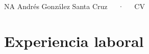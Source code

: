 \documentclass[11pt,a4paper,]{awesome-cv}
\begin{document}
\makecvheader

\makecvfooter
  {NA}
    {Andrés González Santa Cruz~~~·~~~CV}
  {\thepage}





\hypertarget{experiencia-laboral}{%
\section{Experiencia laboral}\label{experiencia-laboral}}
\end{document}
